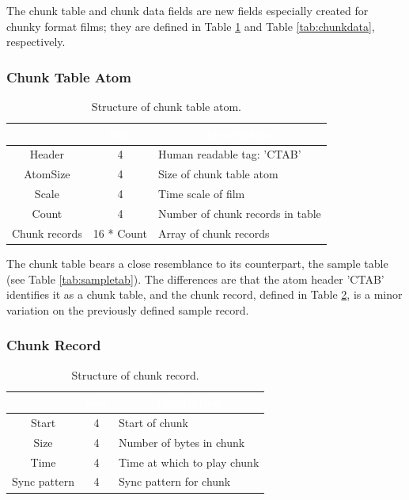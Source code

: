 \documentclass[12pt,letterpaper,twoside]{article}
\newcommand{\tabheadtxt}[1]{\multicolumn{1}{c}{\textcolor{white}{\textbf{#1}}}}
\begin{document}
The chunk table and chunk data fields are new fields especially created for chunky format films; they are defined in Table \ref{tab:chunktab} and Table \ref{tab:chunkdata}, respectively. 

\subsubsection{Chunk Table Atom}

\begin{table}[h]
\centering
\begin{tabular}{|c|c|p{6cm}|}
\hline
\rowcolor{black}
\tabheadtxt{Field} & \tabheadtxt{Size} & \tabheadtxt{Description} \\
\hline
Header & 4 & Human readable tag: 'CTAB'\\
\hline
AtomSize & 4 & Size of chunk table atom\\
\hline
Scale & 4 & Time scale of film\\
\hline
Count & 4 & Number of chunk records in table\\
\hline
Chunk records & 16 * Count & Array of chunk records\\
\hline
\end{tabular}
\caption{Structure of chunk table atom.}
\label{tab:chunktab}
\end{table}
\FloatBarrier

The chunk table bears a close resemblance to its counterpart, the sample table (see Table \ref{tab:sampletab}). The differences are that the atom header 'CTAB' identifies it as a chunk table, and the chunk record, defined in Table \ref{tab:chunkrec}, is a minor variation on the previously defined sample record.

\subsubsection{Chunk Record}

\begin{table}[h]
\centering
\begin{tabular}{|c|c|p{6cm}|}
\hline
\rowcolor{black}
\tabheadtxt{Field} & \tabheadtxt{Size} & \tabheadtxt{Description} \\
\hline
Start & 4 & Start of chunk\\
\hline
Size & 4 & Number of bytes in chunk\\
\hline
Time & 4 & Time at which to play chunk\\
\hline
Sync pattern & 4 & Sync pattern for chunk\\
\hline
\end{tabular}
\caption{Structure of chunk record.}
\label{tab:chunkrec}
\end{table}
\FloatBarrier
\end{document}
